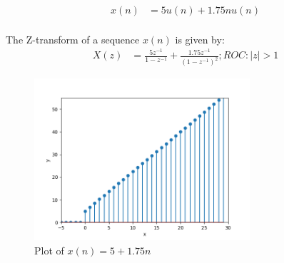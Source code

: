 \documentclass[journal,12pt,twocolumn]{IEEEtran}
\theoremstyle{remark}
\begin{document}
 \begin{center}
	 \begin{align}
		 x(n) &= 5u(n) + 1.75nu(n)
	 \end{align}
	 \\The Z-transform of a sequence $x(n)$ is given by:
	 \begin{align}
		  X(z) &= \frac{5z^{-1}}{1-z^{-1}}+\frac{1.75z^{-1}}{(1-z^{-1})^{2}} ; ROC : |z| > 1
	 \end{align}

	 \begin{figure}
		     \centering
		         \includegraphics[width = 8cm]{figs/fig1.png}
			     \caption{Plot of $x(n) = 5 + 1.75n$}
			         \label{fig:enter-label}
	 \end{figure}

 \end{center}
 
\end{document}
